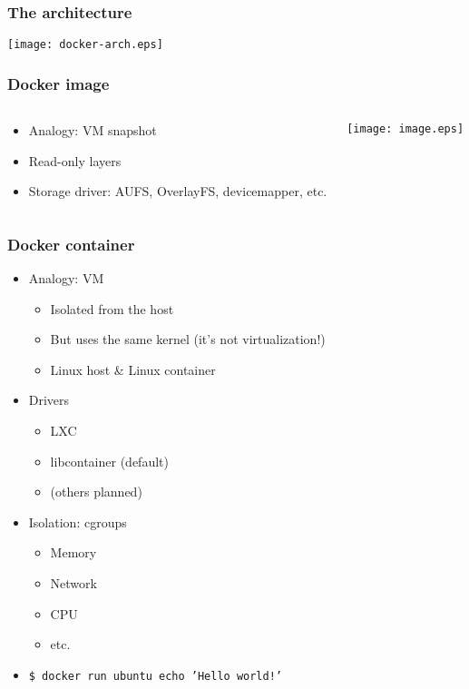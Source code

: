 \documentclass[xetex,mathserif,serif]{beamer}
\begin{document}
  \begin{frame}
    \frametitle{The architecture}
    \texttt{[image: docker-arch.eps]}
  \end{frame}
  \begin{frame}
    \frametitle{Docker image}
    \begin{columns}
      \begin{column}{0.5\textwidth}
        \begin{itemize}
          \item Analogy: VM snapshot
          \item Read-only layers
          \item Storage driver: AUFS, OverlayFS, devicemapper, etc.
        \end{itemize}
      \end{column}
      \begin{column}{0.5\textwidth}
        \texttt{[image: image.eps]}
      \end{column}
    \end{columns}
  \end{frame}
  \begin{frame}
    \frametitle{Docker container}
    \begin{itemize}
      \item Analogy: VM
        \begin{itemize}
          \item Isolated from the host
          \item But uses the same kernel (it's not virtualization!)
          \item Linux host \& Linux container
        \end{itemize}
      \item Drivers
        \begin{itemize}
          \item LXC
          \item libcontainer (default)
          \item (others planned)
        \end{itemize}
      \item Isolation: cgroups
      \begin{itemize}
        \item Memory
        \item Network
        \item CPU
        \item etc.
      \end{itemize}
    \item \texttt{\$ docker run ubuntu echo 'Hello world!'}
    \end{itemize}
  \end{frame}
\end{document}
